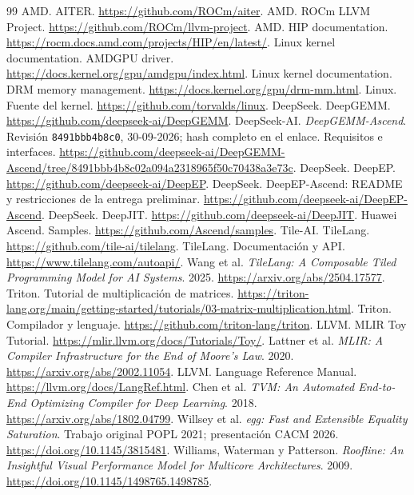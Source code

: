 \begin{thebibliography}{99}
 AMD. AITER. \url{https://github.com/ROCm/aiter}.
 AMD. ROCm LLVM Project. \url{https://github.com/ROCm/llvm-project}.
 AMD. HIP documentation. \url{https://rocm.docs.amd.com/projects/HIP/en/latest/}.
 Linux kernel documentation. AMDGPU driver. \url{https://docs.kernel.org/gpu/amdgpu/index.html}.
 Linux kernel documentation. DRM memory management. \url{https://docs.kernel.org/gpu/drm-mm.html}.
 Linux. Fuente del kernel. \url{https://github.com/torvalds/linux}.
 DeepSeek. DeepGEMM. \url{https://github.com/deepseek-ai/DeepGEMM}.
 DeepSeek-AI. \emph{DeepGEMM-Ascend}. Revisión \texttt{8491bbb4b8c0}, 30-09-2026; hash completo en el enlace. Requisitos e interfaces. \url{https://github.com/deepseek-ai/DeepGEMM-Ascend/tree/8491bbb4b8c02a094a2318965f50c70438a3e73c}.
 DeepSeek. DeepEP. \url{https://github.com/deepseek-ai/DeepEP}.
 DeepSeek. DeepEP-Ascend: README y restricciones de la entrega preliminar. \url{https://github.com/deepseek-ai/DeepEP-Ascend}.
 DeepSeek. DeepJIT. \url{https://github.com/deepseek-ai/DeepJIT}.
 Huawei Ascend. Samples. \url{https://github.com/Ascend/samples}.
 Tile-AI. TileLang. \url{https://github.com/tile-ai/tilelang}.
 TileLang. Documentación y API. \url{https://www.tilelang.com/autoapi/}.
 Wang et al. \emph{TileLang: A Composable Tiled Programming Model for AI Systems}. 2025. \url{https://arxiv.org/abs/2504.17577}.
 Triton. Tutorial de multiplicación de matrices. \url{https://triton-lang.org/main/getting-started/tutorials/03-matrix-multiplication.html}.
 Triton. Compilador y lenguaje. \url{https://github.com/triton-lang/triton}.
 LLVM. MLIR Toy Tutorial. \url{https://mlir.llvm.org/docs/Tutorials/Toy/}.
 Lattner et al. \emph{MLIR: A Compiler Infrastructure for the End of Moore's Law}. 2020. \url{https://arxiv.org/abs/2002.11054}.
 LLVM. Language Reference Manual. \url{https://llvm.org/docs/LangRef.html}.
 Chen et al. \emph{TVM: An Automated End-to-End Optimizing Compiler for Deep Learning}. 2018. \url{https://arxiv.org/abs/1802.04799}.
 Willsey et al. \emph{egg: Fast and Extensible Equality Saturation}. Trabajo original POPL 2021; presentación CACM 2026. \url{https://doi.org/10.1145/3815481}.
 Williams, Waterman y Patterson. \emph{Roofline: An Insightful Visual Performance Model for Multicore Architectures}. 2009. \url{https://doi.org/10.1145/1498765.1498785}.

\end{thebibliography}
